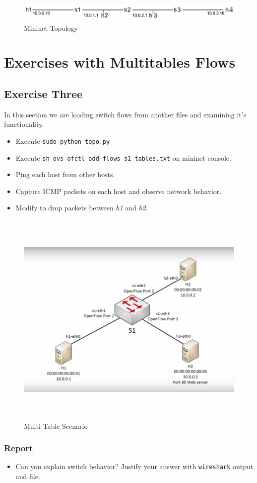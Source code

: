\documentclass{../UTNetLab}
\begin{document}
    \begin{figure}[H]
    	\centering
    	\includegraphics[height=30pt]{img/fig1.png}
    	\caption{Mininet Topology}
    	\label{fig:linearRouters}
    \end{figure}


\section{Exercises with Multitables Flows}
    \subsection*{Exercise Three}
    In this section we are loading switch flows from another files and examining it's functionality.

    \begin{itemize}
    	\item Execute \lstinline{sudo python topo.py} 
    	\item Execute \lstinline{sh ovs-ofctl add-flows s1 tables.txt} on mininet console.
    	\item Ping each host from other hosts.
    	\item Capture ICMP packets on each host and observe network behavior.
    	\item Modify  to drop packets between \textit{h1} and \textit{h2}.
    \end{itemize}

    \begin{figure}[H]
    	\centering
    	\includegraphics[height=300pt]{img/fig2.png}
    	\caption{Multi Table Scenario}
    	\label{fig:MultiTableScenario}
    \end{figure}


    \subsubsection*{Report}
    \begin{itemize}
    	\item Can you explain switch behavior? Justify your answer with \lstinline{wireshark} output and  file.
    \end{itemize}
\end{document}
